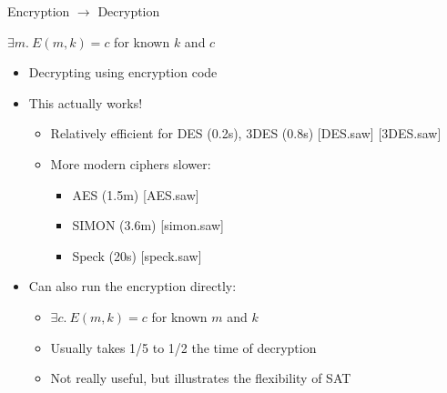 \documentclass[ignorenonframetext,]{beamer}
\providecommand{\tightlist}{%
  \setlength{\itemsep}{0pt}\setlength{\parskip}{0pt}}
\newcommand{\infile}[1]{{\tiny \alert{[#1]}}}
\begin{document}
\begin{frame}{Encryption \(\rightarrow\) Decryption}

\begin{center}
$\exists m.~E(m, k) = c$ for known $k$ and $c$
\end{center}

\begin{itemize}
\tightlist
\item
  Decrypting using encryption code
\item
  This actually works!

  \begin{itemize}
  \tightlist
  \item
    Relatively efficient for DES (0.2s), 3DES (0.8s) \infile{DES.saw}
    \infile{3DES.saw}
  \item
    More modern ciphers slower:

    \begin{itemize}
    \tightlist
    \item
      AES (1.5m) \infile{AES.saw}
    \item
      SIMON (3.6m) \infile{simon.saw}
    \item
      Speck (20s) \infile{speck.saw}
    \end{itemize}
  \end{itemize}
\item
  Can also run the encryption directly:

  \begin{itemize}
  \tightlist
  \item
    \(\exists c.~E(m, k) = c\) for known \(m\) and \(k\)
  \item
    Usually takes 1/5 to 1/2 the time of decryption
  \item
    Not really useful, but illustrates the flexibility of SAT
  \end{itemize}
\end{itemize}

\end{frame}
\end{document}
